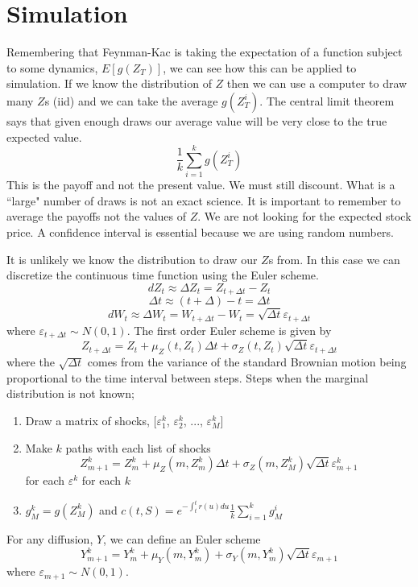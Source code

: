 \documentclass[12pt]{article}
\begin{document}
\pagebreak

\section{Simulation}

Remembering that Feynman-Kac is taking the expectation of a function subject to
some dynamics, $E[g(Z_T)]$, we can see how this can be applied to simulation.
If we know the distribution of $Z$ then we can use a computer to draw many
$Z$s (iid) and we can take the average $g(Z_T^i)$.
The  central limit theorem says that given enough draws our average value will
be  very close to the true expected value.
$$\frac{1}{k}\sum_{i=1}^kg(Z_T^i)$$
This is the payoff and not the present value. We must still discount.
What is a ``large" number of draws is  not an exact science.
It is important to remember to average the payoffs  not the values of $Z$.
We are not looking for the expected stock price.
A  confidence interval is essential because we are using random numbers.

It is unlikely we know the distribution to draw our $Z$s from. In this case we
can discretize the continuous time function using the Euler scheme.
$$dZ_t\approx\Delta Z_t=Z_{t+\Delta t}-Z_t$$
$$\Delta t\approx (t+\Delta)-t=\Delta t$$
$$dW_t\approx\Delta W_t=W_{t+\Delta t}-W_t=
\sqrt{\Delta t}\varepsilon_{t+\Delta t}$$
where $\varepsilon_{t+\Delta t}\sim N(0,1)$.
The first order Euler scheme is given by
$$Z_{t+\Delta t}=Z_t+\mu_Z(t,Z_t)\Delta t+\sigma_Z(t,Z_t)\sqrt{\Delta t}
\varepsilon_{t+\Delta t}$$
where the $\sqrt{\Delta t}$ comes from the variance of the standard Brownian
motion being proportional to the time interval between steps.
Steps when the marginal distribution is not known;
\begin{enumerate}
  \item Draw a matrix of shocks, [$\varepsilon_1^k$, $\varepsilon_2^k$,
    ..., $\varepsilon_M^k$]
  \item Make $k$ paths with each list of shocks
    $$Z_{m+1}^k=Z_m^k+\mu_Z(m,Z_m^k)\Delta t+\sigma_Z(m,Z_M^k)\sqrt{\Delta t}
    \varepsilon_{m+1}^k$$
    for each $\varepsilon^k$ for each $k$
  \item $g_M^k=g(Z_M^k)$ and
    $c(t,S)=e^{-\int_t^tr(u)du}\frac{1}{k}\sum_{i=1}^kg_M^i$
\end{enumerate}
For any diffusion, $Y$, we can define an Euler scheme
$$Y_{m+1}^k=Y_m^k+\mu_Y(m,Y_m^k)+
\sigma_Y(m,Y_m^k)\sqrt{\Delta t}\varepsilon_{m+1}$$
where $\varepsilon_{m+1}\sim N(0,1)$.
\end{document}
